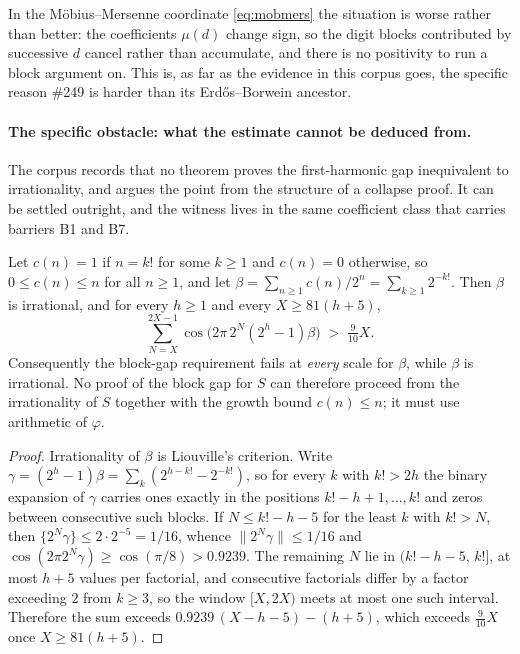 In the M\"obius--Mersenne coordinate \eqref{eq:mobmers} the situation is
worse rather than better: the coefficients $\mu(d)$ change sign, so the
digit blocks contributed by successive $d$ cancel rather than accumulate,
and there is no positivity to run a block argument on. This is, as far as
the evidence in this corpus goes, the specific reason \#249 is harder than
its Erd\H{o}s--Borwein ancestor.

\paragraph{The specific obstacle: what the estimate cannot be deduced from.}
The corpus records that no theorem proves the first-harmonic gap
inequivalent to irrationality, and argues the point from the structure of a
collapse proof. It can be settled outright, and the witness lives in the
same coefficient class that carries barriers B1 and B7.

\begin{thm}\label{thm:lacunary}
Let $c(n)=1$ if $n=k!$ for some $k\ge 1$ and $c(n)=0$ otherwise, so
$0\le c(n)\le n$ for all $n\ge 1$, and let $\beta=\sum_{n\ge1}c(n)/2^{n}
=\sum_{k\ge 1}2^{-k!}$. Then $\beta$ is irrational, and for every $h\ge 1$
and every $X\ge 81(h+5)$,
\[
  \sum_{N=X}^{2X-1}\cos\bigl(2\pi\,2^{N}(2^{h}-1)\beta\bigr) \;>\; \tfrac{9}{10}X .
\]
Consequently the block-gap requirement fails at \emph{every} scale for
$\beta$, while $\beta$ is irrational. No proof of the block gap for $S$ can
therefore proceed from the irrationality of $S$ together with the growth
bound $c(n)\le n$; it must use arithmetic of $\varphi$.
\end{thm}

\begin{proof}
Irrationality of $\beta$ is Liouville's criterion. Write
$\gamma=(2^{h}-1)\beta=\sum_{k}(2^{h-k!}-2^{-k!})$, so for every $k$ with
$k!>2h$ the binary expansion of $\gamma$ carries ones exactly in the
positions $k!-h+1,\dots,k!$ and zeros between consecutive such blocks. If
$N\le k!-h-5$ for the least $k$ with $k!>N$, then
$\{2^{N}\gamma\}\le 2\cdot 2^{-5}=1/16$, whence $\|2^{N}\gamma\|\le 1/16$ and
$\cos(2\pi 2^{N}\gamma)\ge\cos(\pi/8)>0.9239$. The remaining $N$ lie in
$(k!-h-5,\,k!]$, at most $h+5$ values per factorial, and consecutive
factorials differ by a factor exceeding $2$ from $k\ge 3$, so the window
$[X,2X)$ meets at most one such interval. Therefore the sum exceeds
$0.9239\,(X-h-5)-(h+5)$, which exceeds $\tfrac{9}{10}X$ once
$X\ge 81(h+5)$.
\end{proof}

